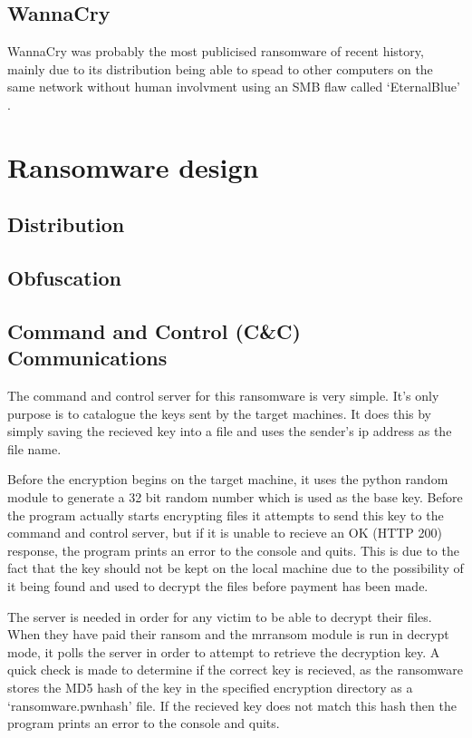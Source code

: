 \documentclass[12pt]{article}
\begin{document}
  \subsection{WannaCry}
    WannaCry was probably the most publicised ransomware of recent history, mainly due to its distribution being able to spead to other computers on the same network without human involvment using an SMB flaw called ‘EternalBlue’ \citep{symnatec2017wannacry}.

\section{Ransomware design}

  \subsection{Distribution}

  \subsection{Obfuscation}

  \subsection{Command and Control (C\&C) Communications}
    The command and control server for this ransomware is very simple. It's only purpose is to catalogue the keys sent by the target machines. It does this by simply saving the recieved key into a file and uses the sender's ip address as the file name.

    Before the encryption begins on the target machine, it uses the python random module to generate a 32 bit random number which is used as the base key. Before the program actually starts encrypting files it attempts to send this key to the command and control server, but if it is unable to recieve an OK (HTTP 200) response, the program prints an error to the console and quits. This is due to the fact that the key should not be kept on the local machine due to the possibility of it being found and used to decrypt the files before payment has been made.

    The server is needed in order for any victim to be able to decrypt their files. When they have paid their ransom and the mrransom module is run in decrypt mode, it polls the server in order to attempt to retrieve the decryption key. A quick check is made to determine if the correct key is recieved, as the ransomware stores the MD5 hash of the key in the specified encryption directory as a ‘ransomware.pwnhash’ file. If the recieved key does not match this hash then the program prints an error to the console and quits.
\end{document}
